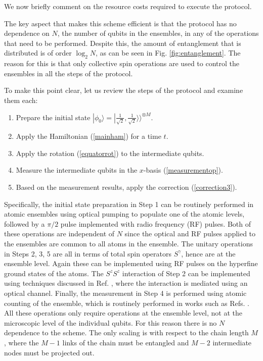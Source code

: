 \documentclass[%
  prx,%
  twocolumn,%
  preprintnumbers,%
  amsmath,%
  amssymb,%
  superscriptaddress%
]{revtex4}
\begin{document}
We now briefly comment on the resource costs required to execute the protocol.  {%
The key aspect that makes this scheme efficient is that the protocol has no dependence on $ N $, the number of qubits in the ensembles, in any of the operations that need to be performed.  Despite this, the amount of entanglement that is distributed is of order $ \log_2 N $, as can be seen in Fig. \ref{fig:entanglement}.  The reason for this is that only collective spin operations are used to control the ensembles in all the steps of the protocol.

To make this point clear, let us review the steps of the protocol and examine them each:
%
\begin{enumerate}
\item Prepare the initial state $ | \phi_0 \rangle = |\frac{1}{\sqrt{2}}, \frac{1}{\sqrt{2}} \rangle \rangle^{\otimes M} $.
\item Apply the Hamiltonian (\ref{mainham}) for a time $ t $.
\item Apply the rotation (\ref{equatorrot}) to the intermediate qubits.
\item Measure the intermediate qubits in the $ x $-basis (\ref{measurementop}).
\item Based on the measurement results, apply the correction (\ref{correction3}).
\end{enumerate}
%
Specifically, the initial state preparation in Step 1 can be routinely performed in atomic ensembles using optical pumping to populate one of the atomic levels, followed by a $ \pi/2 $ pulse implemented with radio frequency (RF) pulses. Both of these operations are independent of $ N $ since the optical and RF pulses applied to the ensembles are common to all atoms in the ensemble.  The unitary operations in Steps 2, 3, 5 are all in terms of total spin operators $ S^\gamma $, hence are at the ensemble level. Again these can be implemented using RF pulses on the hyperfine ground states of the atoms.  The $ S^z S^z $ interaction of Step 2 can be implemented using techniques discussed in Ref. \cite{pyrkov2013entanglement,hussain2014geometric}, where the interaction is mediated using an optical channel.  Finally, the measurement in Step 4 is performed using atomic counting of the ensemble, which is routinely performed in works such as Refs. \cite{Hume2013,Ott2016,Qu2020}.  All these operations only require operations at the ensemble level, not at the microscopic level of the individual qubits.  For this reason there is no $ N $ dependence to the scheme.  The only scaling is with respect to the chain length $ M $, where the $ M - 1 $ links of the chain must be entangled and $ M - 2$ intermediate nodes must be projected out.

}
\end{document}
